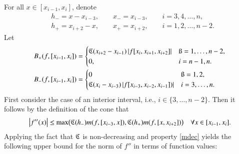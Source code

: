 \documentclass[review]{elsarticle}
\theoremstyle{definition}
\begin{document}
For all $ x \in [x_{i-1},x_i]$,  denote
\begin{align*}
&h_- = x - x_{i-3}, \qquad x_- = x_{i-3},  \qquad i=3,4,\ldots,n,\\
 &h_+ = x_{i+2} - x, \qquad x_+ =  x_{i+2}, \qquad i=1,2,\ldots,n-2.
\end{align*}
Let
\begin{align*}
B_{+}(f,[x_{i-1},x_i])&=\begin{cases}
    \fC(x_{i+2}-x_{i-1})\abs{f[x_i,x_{i+1},x_{i+2}]}  & \i=1,\ldots,n-2,
\\ 0, & i=n-1,n.
\end{cases}\\
 B_{-}(f,[x_{i-1},x_i])&=\begin{cases}
   0  & \i=1,2,
\\ \fC(x_{i}-x_{i-3})\abs{f[x_{i-3},x_{i-2},x_{i-1}])} & i=3,\ldots,n.
\end{cases}
\end{align*}
First consider the case of an interior interval, i.e., $i \in \{3, \ldots, n-2\}$. Then it follows by the definition of the cone that
\begin{equation*}
\left \lvert f''(x) \right \rvert \le \max\bigl(\mathfrak{C}(h_-)m(f,[x_{i-3},x]),\mathfrak{C}(h_+)m(f,[x,x_{i+2}])\bigr)  \quad  \forall x \in [x_{i-1},x_i].
\end{equation*}
Applying the fact that $\mathfrak{C}$ is non-decreasing and property \eqref{mdec} yields
the following upper bound for the norm of $f''$ in terms of function values:
\end{document}
